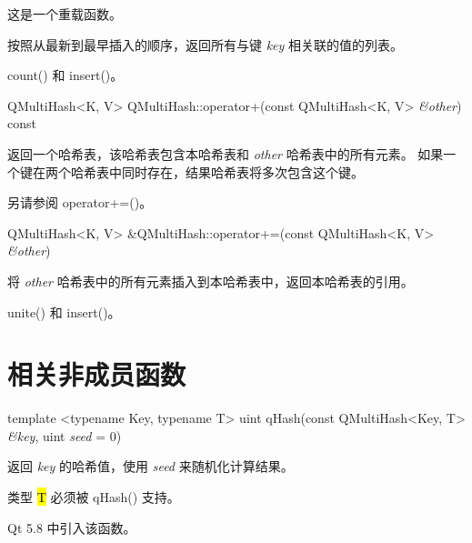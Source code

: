 这是一个重载函数。

按照从最新到最早插入的顺序，返回所有与键 \emph{key} 相关联的值的列表。

\begin{seeAlso}
count() 和 insert()。
\end{seeAlso}

QMultiHash<K, V> QMultiHash::operator+(const QMultiHash<K, V> \emph{\&other}) const

返回一个哈希表，该哈希表包含本哈希表和 \emph{other} 哈希表中的所有元素。
如果一个键在两个哈希表中同时存在，结果哈希表将多次包含这个键。

\begin{seeAlso}
另请参阅 operator+=()。
\end{seeAlso}

QMultiHash<K, V> \&QMultiHash::operator+=(const QMultiHash<K, V> \emph{\&other})

将 \emph{other} 哈希表中的所有元素插入到本哈希表中，返回本哈希表的引用。

\begin{seeAlso}
unite() 和 insert()。
\end{seeAlso}

\section{相关非成员函数}

template <typename Key, typename T> uint qHash(const QMultiHash<Key, T> \emph{\&key}, uint \emph{seed} = 0)

返回 \emph{key} 的哈希值，使用 \emph{seed} 来随机化计算结果。

类型 \hl{T} 必须被 qHash() 支持。

Qt 5.8 中引入该函数。